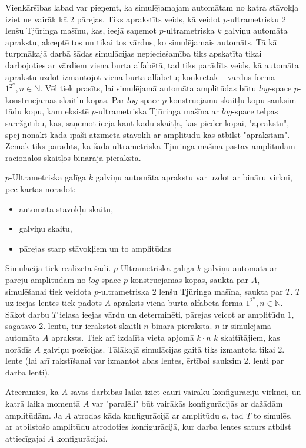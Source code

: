 \documentclass{ludis}
\begin{document}
Vienkāršības labad var pieņemt, ka simulējamajam automātam no katra stāvokļa iziet ne vairāk kā $2$ pārejas. Tiks aprakstīts veids, kā veidot $p$-ultrametrisku $2$ lenšu Tjūringa mašīnu, kas, ieejā saņemot $p$-ultrametriska $k$ galviņu automāta aprakstu, akceptē tos un tikai tos vārdus, ko simulējamais automāts. Tā kā turpmākajā darbā šādas simulācijas nepieciešamība tiks apskatīta tikai darbojoties ar vārdiem viena burta alfabētā, tad tiks parādīts veids, kā automāta aprakstu uzdot izmantojot viena burta alfabētu; konkrētāk -- vārdus formā $1^{2^n}, n \in \mathbb{N}$. Vēl tiek prasīts, lai simulējamā automāta amplitūdas būtu $log$-space $p$-konstruējamas skaitļu kopas. Par $log$-space $p$-konstruējamu skaitļu kopu sauksim tādu kopu, kam eksistē $p$-ultrametriska Tjūringa mašīna ar $log$-space telpas sarežģītību, kas, saņemot ieejā kaut kādu skaitļa, kas pieder kopai, "aprakstu", spēj nonākt kādā īpaši atzīmētā stāvoklī ar amplitūdu kas atbilst "aprakstam". Zemāk tiks parādīts, ka šāda ultrametriska Tjūringa mašīna pastāv amplitūdām racionālos skaitļos binārajā pierakstā.

$p$-Ultrametriska galīga $k$ galviņu automāta aprakstu var uzdot ar bināru virkni, pēc kārtas norādot:
\begin{itemize}
	\item automāta stāvokļu skaitu,
	\item galviņu skaitu,
	\item pārejas starp stāvokļiem un to amplitūdas %
\end{itemize}

Simulācija tiek realizēta šādi. $p$-Ultrametriska galīga $k$ galviņu automāta ar pāreju amplitūdām no $log$-space $p$-konstruējamas kopas, saukta par $A$, simulēšanai tiek veidota $p$-ultrametriska $2$ lenšu Tjūringa mašīna, saukta par $T$. $T$ uz ieejas lentes tiek padots $A$ apraksts viena burta alfabētā formā $1^{2^n}, n \in \mathbb{N}$. Sākot darbu $T$ ielasa ieejas vārdu un determinēti, pārejas veicot ar amplitūdu $1$, sagatavo 2. lentu, tur ierakstot skaitli $n$ binārā pierakstā. $n$ ir simulējamā automāta $A$ apraksts. Tiek arī izdalīta vieta apjomā $k \cdot n$ $k$ skaitītājiem, kas norādīs $A$ galviņu pozīcijas. Tālākajā simulācijas gaitā tiks izmantota tikai 2. lente (lai arī rakstīšanai var izmantot abas lentes, ērtībai sauksim 2. lenti par darba lenti).

Atceramies, ka $A$ savas darbības laikā iziet cauri vairāku konfigurāciju virknei, un katrā laika momentā $A$ var "paralēli" būt vairākās konfigurācijās ar dažādām amplitūdām. %
Ja $A$ atrodas kāda konfigurācijā ar amplitūdu $a$, tad $T$ to simulēs, ar atbilstošo amplitūdu atrodoties konfigurācijā, kur darba lentes saturs atbilst attiecīgajai $A$ konfigurācijai.
\end{document}
